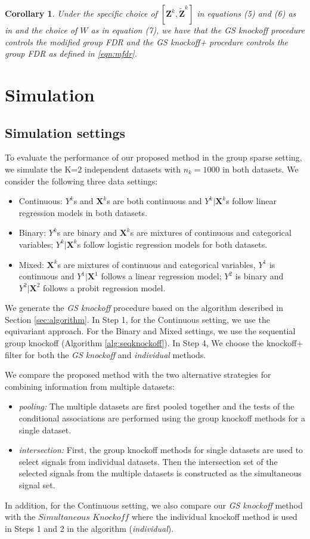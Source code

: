 \documentclass[11pt]{article}
\theoremstyle{plain}
\newtheorem{corollary}[theorem]{Corollary}
\theoremstyle{definition}
\theoremstyle{remark}
\def\Z{\mathbf{Z}}
\newcommand{\X}{\mathbf{X}}
\newcommand{\0}{\mathbf{0}}
\begin{document}
\begin{corollary} Under the specific choice of $[\Z^k,\widetilde{\Z}^k]$ in equations (5) and (6) as in and the choice of $W$ as in equation (7), we have that the \textit{GS knockoff} procedure controls the modified group FDR and the \textit{GS knockoff}+ procedure controls the group FDR as defined in \eqref{eqn:mfdr}.
\end{corollary}

\section{Simulation}

\subsection{Simulation settings}
To evaluate the performance of our proposed method in the group sparse setting, we simulate the K=2 independent datasets with $n_k = 1000$ in both datasets. We consider the following three data settings:
\begin{itemize}
\item Continuous: $Y^k$s and $\X^k$s are both continuous and $Y^k|\X^k$s follow linear regression models in both datasets.
\item Binary: $Y^k$s are binary and $\X^k$s are mixtures of continuous and categorical variables; $Y^k|\X^k$s follow logistic regression models for both datasets.
\item Mixed: $\X^k$s are mixtures of continuous and categorical variables, $Y^1$ is continuous and $Y^1|\X^1$ follows a linear regression model; $Y^2$ is binary and $Y^2|\X^2$ follows a probit regression model.
\end{itemize}


We generate the \textit{GS knockoff} procedure based on the algorithm described in Section \ref{sec:algorithm}. In Step 1, for the Continuous setting, we use the equivariant approach. For the Binary and Mixed settings, we use the sequential group knockoff (Algorithm \ref{alg:seqknockoff}). In Step 4, We choose the knockoff+ filter for both the \textit{GS knockoff} and \textit{individual} methods.

We compare the proposed method with the two alternative strategies for combining information from multiple datasets: 
\begin{itemize}
    \item \textit{pooling:} The multiple datasets are  first pooled together and the tests of the conditional associations are performed using the group knockoff methods for a single dataset.
    \item \textit{intersection:} First, the group knockoff methods for single datasets are used to select signals from individual datasets. Then the intersection set of the selected signals from the multiple datasets is constructed as the simultaneous signal set.
\end{itemize}
 In addition, for the Continuous setting, we also compare our \textit{GS knockoff} method with the $\textit{Simultaneous Knockoff}$ \cite{dai2021multiple} where the individual knockoff method \citep{barber2015} is used in Steps 1 and 2 in the algorithm (\textit{individual}). 
\end{document}
